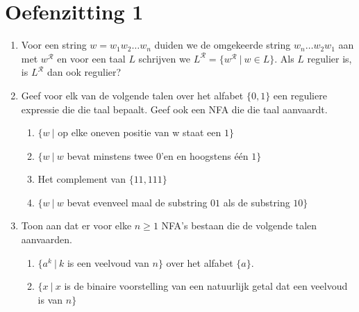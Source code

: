 \documentclass[a4paper]{article}
\newcommand{\R}{\mathcal{R}}
\begin{document}
\section*{Oefenzitting 1}

\begin{enumerate}
   \item Voor een string $w = w_1 w_2 \ldots w_n$ duiden we de omgekeerde string $w_n \ldots w_2  w_1$ aan met $w^{\R}$ en voor een taal $L$ schrijven we $L^{\R} = \{ w^{\R} \ | \ w \in L\}$.
         Als $L$ regulier is, is $L^{\R}$ dan ook regulier?
	\item Geef voor elk van de volgende talen over het alfabet $\{ 0,1 \}$ een reguliere expressie die die taal bepaalt. Geef ook een NFA die die taal aanvaardt.
			\begin{enumerate}
				\item $\{ w \ | $ op elke oneven positie van w staat een $1 \}$                           %
				\item $\{ w \ | \ w$ bevat minstens twee $0$'en en hoogstens \'e\'en $1 \}$               %
				\item Het complement van $\{ 11,111\}$																		%
				\item $\{ w \ | \ w$ bevat evenveel maal de substring $01$ als de substring $10\}$		   %
			\end{enumerate}
	\item	Toon aan dat er voor elke $n \geq 1$ NFA's bestaan die de volgende talen aanvaarden.
			\begin{enumerate}
				\item $\{ a^k \ | \ k $ is een veelvoud van $n \}$ over het alfabet $\{ a \}$.                                 %
				\item $\{ x \ | \ x $ is de binaire voorstelling van een natuurlijk getal dat een veelvoud is van $n \}$ \\    %
			\end{enumerate}
\end{enumerate}
\end{document}
